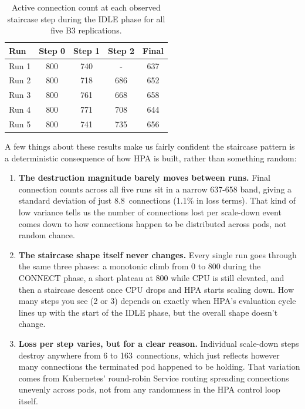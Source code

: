 \documentclass[twocolumn]{svjour3}
\begin{document}
\begin{table}[!ht]
\centering
\caption{Active connection count at each observed staircase step during the IDLE phase for all five B3 replications.}
\label{tab:b3_steps}
\begin{tabular*}{\columnwidth}{@{\extracolsep{\fill}}lcccc@{}}
\toprule
\textbf{Run} & \textbf{Step 0} & \textbf{Step 1} & \textbf{Step 2} & \textbf{Final} \\
\midrule
Run 1 & 800 & 740 &-& 637 \\
Run 2 & 800 & 718 & 686 & 652 \\
Run 3 & 800 & 761 & 668 & 658 \\
Run 4 & 800 & 771 & 708 & 644 \\
Run 5 & 800 & 741 & 735 & 656 \\
\bottomrule
\end{tabular*}
\end{table}

A few things about these results make us fairly confident the staircase pattern is
a deterministic consequence of how HPA is built, rather than something random:

\begin{enumerate}[leftmargin=*]
\item \textbf{The destruction magnitude barely moves between runs.} Final
connection counts across all five runs sit in a narrow 637-658 band, giving a
standard deviation of just 8.8~connections (1.1\% in loss terms). That kind of low
variance tells us the number of connections lost per scale-down event comes down to
how connections happen to be distributed across pods, not random chance.

\item \textbf{The staircase shape itself never changes.} Every single run goes
through the same three phases: a monotonic climb from 0 to 800 during the CONNECT
phase, a short plateau at 800 while CPU is still elevated, and then a staircase
descent once CPU drops and HPA starts scaling down. How many steps you see (2 or 3)
depends on exactly when HPA's evaluation cycle lines up with the start of the IDLE
phase, but the overall shape doesn't change.

\item \textbf{Loss per step varies, but for a clear reason.} Individual scale-down
steps destroy anywhere from 6 to 163~connections, which just reflects however many
connections the terminated pod happened to be holding. That variation comes from
Kubernetes' round-robin Service routing spreading connections unevenly across
pods, not from any randomness in the HPA control loop itself.
\end{enumerate}
\end{document}
